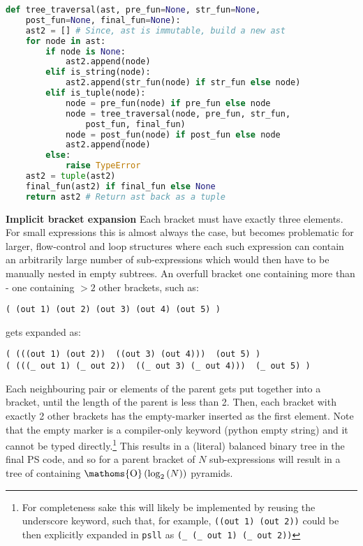 \documentclass[aip,jcp,reprint,footinbib]{revtex4-1}
\DeclareMathOperator{\bigO}{\ensuremath{\mathoms{O}}}
\let\tt\texttt
\newcommand\psll{\texttt{psll}\xspace}
\begin{document}
\begin{lstlisting}[language=python,
    label={lst:tree_traversal},caption={
    Core \psll function performing a depth-first walk through the abstract syntax tree and application of appropriate functions.
}]
def tree_traversal(ast, pre_fun=None, str_fun=None,
    post_fun=None, final_fun=None):
    ast2 = [] # Since, ast is immutable, build a new ast
    for node in ast:
        if node is None:
            ast2.append(node)
        elif is_string(node):
            ast2.append(str_fun(node) if str_fun else node)
        elif is_tuple(node):
            node = pre_fun(node) if pre_fun else node
            node = tree_traversal(node, pre_fun, str_fun, 
                post_fun, final_fun)
            node = post_fun(node) if post_fun else node
            ast2.append(node)
        else:
            raise TypeError
    ast2 = tuple(ast2)
    final_fun(ast2) if final_fun else None
    return ast2 # Return ast back as a tuple
\end{lstlisting}

\textbf{Implicit bracket expansion} Each bracket must have exactly three elements. For small expressions this is almost always the case, but becomes problematic for larger, flow-control and loop structures where each such expression can contain an arbitrarily large number of sub-expressions which would then have to be manually nested in empty subtrees. An overfull bracket one containing more than - one containing $>2$ other brackets, such as:
\begin{lstlisting}[language=psll,aboveskip=3pt,belowskip=-2pt,frame=none,numbers=none]
( (out 1) (out 2) (out 3) (out 4) (out 5) )
\end{lstlisting}
gets expanded as:
\begin{lstlisting}[language=psll,aboveskip=3pt,belowskip=-2pt,frame=none,numbers=none]
( (((out 1) (out 2))  ((out 3) (out 4)))  (out 5) )
( (((_ out 1) (_ out 2))  ((_ out 3) (_ out 4)))  (_ out 5) )
\end{lstlisting}
Each neighbouring pair or elements of the parent gets put together into a bracket, until the length of the parent is less than 2. Then, each bracket with exactly 2 other brackets has the empty-marker inserted as the first element. Note that the empty marker is a compiler-only keyword (python empty string) and it cannot be typed directly.\footnote{For completeness sake this will likely be implemented by reusing the underscore keyword, such that, for example, \tt{((out 1) (out 2))} could be then explicitly expanded in \psll as \tt{(\_ (\_ out 1) (\_ out 2))}} This results in a (literal) balanced binary tree in the final PS code, and so for a parent bracket of $N$ sub-expressions will result in a tree of containing $\bigO\left(\log_2\left(N\right)\right)$ pyramids.
\end{document}
